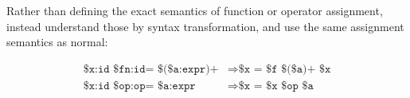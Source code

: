 \begin{prooftree}
\end{prooftree}

Rather than defining the exact semantics of function or operator assignment,
instead understand those by syntax transformation, and use the same assignment
semantics as normal:

\begin{align*}
    \texttt{\$x:id \$fn:id= \$(\$a:expr)+} &\Rightarrow \texttt{\$x = \$f \$(\$a)+ \$x} \\ %
    \texttt{\$x:id \$op:op= \$a:expr} & \Rightarrow \texttt{\$x = \$x \$op \$a} \\ %
\end{align*}
